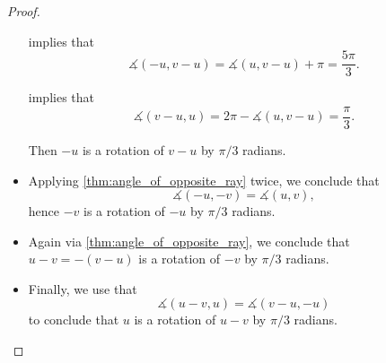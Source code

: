 \begin{proof}
\begin{itemize}
     implies that
    \begin{equation*}
      \measuredangle(-u, v - u) = \measuredangle(u, v - u) + \pi = \frac {5\pi} 3.
    \end{equation*}

     implies that
    \begin{equation*}
      \measuredangle(v - u, u) = 2\pi - \measuredangle(u, v - u) = \frac \pi 3.
    \end{equation*}

    Then \( -u \) is a rotation of \( v - u \) by \( \pi / 3 \) radians.

    \item Applying \cref{thm:angle_of_opposite_ray} twice, we conclude that
    \begin{equation*}
      \measuredangle(-u, -v) = \measuredangle(u, v),
    \end{equation*}
    hence \( -v \) is a rotation of \( -u \) by \( \pi / 3 \) radians.

    \item Again via \cref{thm:angle_of_opposite_ray}, we conclude that \( u - v = -(v - u) \) is a rotation of \( -v \) by \( \pi / 3 \) radians.

    \item Finally, we use that
    \begin{equation*}
      \measuredangle(u - v, u) = \measuredangle(v - u, -u)
    \end{equation*}
    to conclude that \( u \) is a rotation of \( u - v \) by \( \pi / 3 \) radians.
  \end{itemize}
\end{proof}

